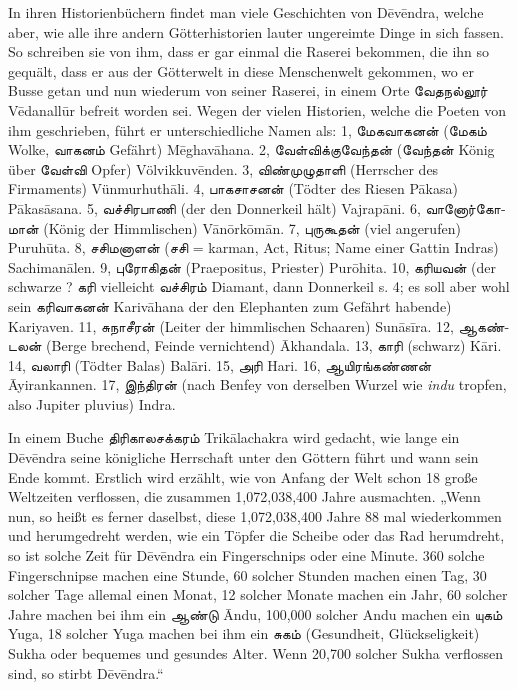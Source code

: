 \documentclass{article}
\newcommand{\TamilText}[1]{\texttamil{#1}}
\newcommand{\tam}[1]{\TamilText{#1}}
\begin{document}
In ihren Historienbüchern findet man viele Geschichten von D\={e}v\={e}ndra, welche aber, wie alle ihre andern Götterhistorien lauter ungereimte Dinge in sich fassen. So schreiben sie von ihm, dass er gar einmal die Raserei bekommen, die ihn so gequält, dass er aus der Götterwelt in diese Menschenwelt gekommen, wo er Busse getan und nun wiederum von seiner Raserei, in einem Orte \tam{வேதநல்லூர்} V\={e}danall\={u}r befreit worden sei. Wegen der vielen Historien, welche die Poeten von ihm geschrieben, führt er unterschiedliche Namen als: 1, \tam{மேகவாகனன்} (\tam{மேகம்} Wolke, \tam{வாகனம்} Gefährt) M\={e}ghav\={a}hana. 2, \tam{வேள்விக்குவேந்தன்} (\tam{வேந்தன்} König über \tam{வேள்வி} Opfer) Völvikkuv\={e}nden. 3, \tam{விண்முழுதாளி} (Herrscher des Firmaments) Vünmurhuth\={a}li. 4, \tam{பாகசாசனன்} (Tödter des Riesen P\={a}kasa) P\={a}kas\={a}sana. 5, \tam{வச்சிரபாணி} (der den Donnerkeil hält) Vajrap\={a}ni. 6, \tam{வானோர்கோமான்} (König der Himmlischen) V\={a}n\={o}rk\={o}m\={a}n. 7, \tam{புருகூதன்} (viel angerufen) Puruh\={u}ta. 8, \tam{சசிமனாளன்} (\tam{சசி} = karman, Act, Ritus; Name einer Gattin Indras) Sachiman\={a}len. 9, \tam{புரோகிதன்} (Praepositus, Priester) Pur\={o}hita. 10, \tam{கரியவன்} (der schwarze ? \tam{கரி} vielleicht \tam{வச்சிரம்} Diamant, dann Donnerkeil s. 4; es soll aber wohl sein \tam{கரிவாகனன்} Kariv\={a}hana der den Elephanten zum Gefährt habende) Kariyaven. 11, \tam{சுநாசீரன்} (Leiter der himmlischen Schaaren) Sun\={a}s\={i}ra. 12, \tam{ஆகண்டலன்} (Berge brechend, Feinde vernichtend) \={A}khandala. 13, \tam{காரி} (schwarz) K\={a}ri. 14, \tam{வலாரி} (Tödter Balas) Bal\={a}ri. 15, \tam{அரி} Hari. 16, \tam{ஆயிரங்கண்ணன்} \={A}yirankannen. 17, \tam{இந்திரன்} (nach Benfey von derselben Wurzel wie \emph{indu} tropfen, also Jupiter pluvius) Indra.

In einem Buche \tam{திரிகாலசக்கரம்} Trik\={a}lachakra wird gedacht, wie lange ein D\={e}v\={e}ndra seine königliche Herrschaft unter den Göttern führt und wann sein Ende kommt. Erstlich wird erzählt, wie von Anfang der Welt schon 18 große Weltzeiten verflossen, die zusammen 1,072,038,400 Jahre ausmachten. „Wenn nun, so heißt es ferner daselbst, diese 1,072,038,400 Jahre 88 mal wiederkommen und herumgedreht werden, wie ein Töpfer die Scheibe oder das Rad herumdreht, so ist solche Zeit für D\={e}v\={e}ndra ein Fingerschnips oder eine Minute. 360 solche Fingerschnipse machen eine Stunde, 60 solcher Stunden machen einen Tag, 30 solcher Tage allemal einen Monat, 12 solcher Monate machen ein Jahr, 60 solcher Jahre machen bei ihm ein \tam{ஆண்டு} \={A}ndu, 100,000 solcher Andu machen ein \tam{யுகம்} Yuga, 18 solcher Yuga machen bei ihm ein \tam{சுகம்} (Gesundheit, Glückseligkeit) Sukha oder bequemes und gesundes Alter. Wenn 20,700 solcher Sukha verflossen sind, so stirbt D\={e}v\={e}ndra.“
\end{document}
